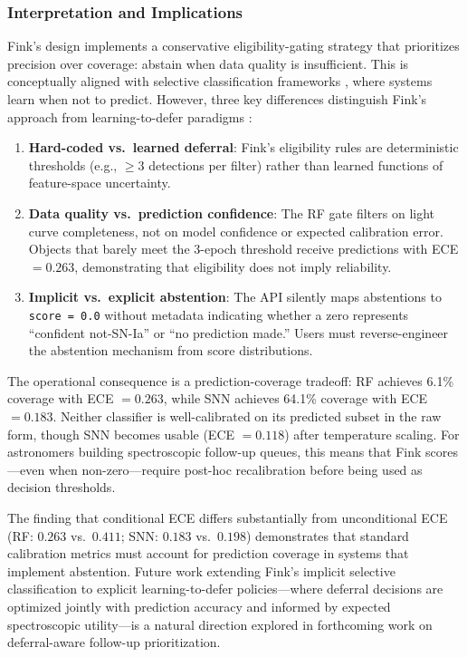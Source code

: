 \documentclass[twocolumn]{aastex631}
\begin{document}
\subsubsection{Interpretation and Implications}

Fink's design implements a conservative eligibility-gating strategy that prioritizes precision over coverage: abstain when data quality is insufficient. This is conceptually aligned with selective classification frameworks \citep{geifman2017}, where systems learn when not to predict. However, three key differences distinguish Fink's approach from learning-to-defer paradigms \citep{mozannar2020}:

\begin{enumerate}
    \item \textbf{Hard-coded vs.\ learned deferral}: Fink's eligibility rules are deterministic thresholds (e.g., $\geq 3$ detections per filter) rather than learned functions of feature-space uncertainty.
    \item \textbf{Data quality vs.\ prediction confidence}: The RF gate filters on light curve completeness, not on model confidence or expected calibration error. Objects that barely meet the 3-epoch threshold receive predictions with ECE $= 0.263$, demonstrating that eligibility does not imply reliability.
    \item \textbf{Implicit vs.\ explicit abstention}: The API silently maps abstentions to \texttt{score = 0.0} without metadata indicating whether a zero represents ``confident not-SN-Ia'' or ``no prediction made.'' Users must reverse-engineer the abstention mechanism from score distributions.
\end{enumerate}

The operational consequence is a prediction-coverage tradeoff: RF achieves 6.1\% coverage with ECE $= 0.263$, while SNN achieves 64.1\% coverage with ECE $= 0.183$. Neither classifier is well-calibrated on its predicted subset in the raw form, though SNN becomes usable (ECE $= 0.118$) after temperature scaling. For astronomers building spectroscopic follow-up queues, this means that Fink scores---even when non-zero---require post-hoc recalibration before being used as decision thresholds.

The finding that conditional ECE differs substantially from unconditional ECE (RF: $0.263$ vs.\ $0.411$; SNN: $0.183$ vs.\ $0.198$) demonstrates that standard calibration metrics must account for prediction coverage in systems that implement abstention. Future work extending Fink's implicit selective classification to explicit learning-to-defer policies---where deferral decisions are optimized jointly with prediction accuracy and informed by expected spectroscopic utility---is a natural direction explored in forthcoming work on deferral-aware follow-up prioritization.
\end{document}
